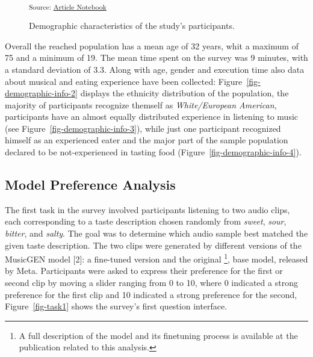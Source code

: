 \documentclass[
  letterpaper,
  DIV=11,
  numbers=noendperiod]{scrartcl}
\begin{document}
\begin{figure}
\begin{minipage}{0.50\linewidth}
{\textsubscript{Source:
\href{https://matteospanio.github.io/multimodal-symphony-survey-analysis/index.qmd.html}{Article
Notebook}}

}


\end{minipage}%

\caption{\label{fig-demographic-info}Demographic characteristics of the
study's participants.}

\end{figure}%

Overall the reached population has a mean age of 32 years, whit a
maximum of 75 and a minimum of 19. The mean time spent on the survey was
9 minutes, with a standard deviation of 3.3. Along with age, gender and
execution time also data about musical and eating experience have been
collected: Figure~\ref{fig-demographic-info-2} displays the ethnicity
distribution of the population, the majority of participants recognize
themself as \emph{White/European American}, participants have an almost
equally distributed experience in listening to music (see
Figure~\ref{fig-demographic-info-3}), while just one participant
recognized himself as an experienced eater and the major part of the
sample population declared to be not-experienced in tasting food
(Figure~\ref{fig-demographic-info-4}).

\subsection{Model Preference Analysis}\label{model-preference-analysis}

The first task in the survey involved participants listening to two
audio clips, each corresponding to a taste description chosen randomly
from \emph{sweet}, \emph{sour}, \emph{bitter}, and \emph{salty}. The
goal was to determine which audio sample best matched the given taste
description. The two clips were generated by different versions of the
MusicGEN model {[}2{]}: a fine-tuned version and the original
\footnote{A full description of the model and its finetuning process is
  available at the publication related to this analysis.}, base model,
released by Meta. Participants were asked to express their preference
for the first or second clip by moving a slider ranging from 0 to 10,
where 0 indicated a strong preference for the first clip and 10
indicated a strong preference for the second, Figure~\ref{fig-task1}
shows the survey's first question interface.
\end{document}
